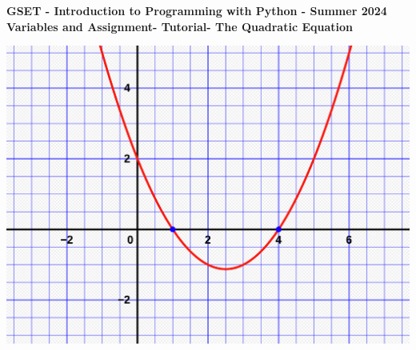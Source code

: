 \documentclass[12pt]{article}
\newcommand{\MNUM}{2} %
\newcommand{\MNAME}{Variables and Assignment} %
\newcommand{\TNAME}{The Quadratic Equation} %
\newcommand{\SEM}{Summer 2024} %
\begin{document}
\thispagestyle{plain}

\begin{center}
   {\bf \large GSET - Introduction to Programming with Python - \SEM} \vspace{5mm}\\
   {\bf \Large \MNAME \hspc -  Tutorial\hspc\MNUM\hspc - \TNAME}\vspace{3mm}\\
   
\end{center}

 \hspace*{3cm}\includegraphics[scale=.15]{quad_equ.png} 
\end{document}
